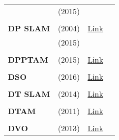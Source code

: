 \documentclass[a4paper,12pt]{scrartcl}
\begin{document}
{\begin{longtable}{l|l|l|l}
                           & \cite{Silveira2015} (2015)        &                                                                    &                       \\
                           &                                   &                                                                    &                       \\
    \textbf{DP SLAM}       & \cite{Eliazar2004} (2004)         & {\href{https://users.cs.duke.edu/~parr/dpslam}{Link}}              &                       \\
                           & \cite{Silveira2015} (2015)        &                                                                    &                       \\
                           &                                   &                                                                    &                       \\
    \textbf{DPPTAM}        & \cite{Concha2015b} (2015)         & {\href{https://github.com/alejocb/dpptam}{Link}}                   &                       \\
                           &                                   &                                                                    &                       \\
    \textbf{DSO}           & \cite{Engel2016} (2016)           & {\href{https://github.com/JakobEngel/dso}{Link}}                   &                       \\
                           &                                   &                                                                    &                       \\
    \textbf{DT SLAM}       & \cite{Daniel2014} (2014)          & {\href{https://github.com/plumonito/dtslam}{Link}}                 &                       \\
                           &                                   &                                                                    &                       \\
    \textbf{DTAM}          & \cite{Newcombe2011} (2011)        & {\href{https://github.com/anuranbaka/OpenDTAM}{Link}}              &                       \\
                           &                                   &                                                                    &                       \\
    \textbf{DVO}           & \cite{Kerl2013} (2013)            & {\href{https://github.com/tum-vision/dvo_slam}{Link}}              &                       \\

\end{longtable}}
\end{document}
